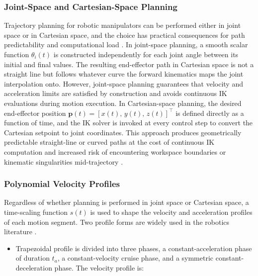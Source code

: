 \subsubsection{Joint-Space and Cartesian-Space Planning}
\hspace{1.27cm}
Trajectory planning for robotic manipulators can be performed
either in joint space or in Cartesian space, and the choice
has practical consequences for path predictability and
computational load \autocite{siciliano-2009}. In
joint-space planning, a smooth scalar function
$\theta_i(t)$ is constructed independently for each joint
angle between its initial and final values. The resulting
end-effector path in Cartesian space is not a straight line
but follows whatever curve the forward kinematics maps the
joint interpolation onto. However, joint-space planning
guarantees that velocity and acceleration limits are satisfied
by construction and avoids continuous IK evaluations during
motion execution. In Cartesian-space planning, the
desired end-effector position
$\mathbf{p}(t) = [x(t),\, y(t),\, z(t)]^{\top}$ is defined
directly as a function of time, and the IK solver is invoked
at every control step to convert the Cartesian setpoint to
joint coordinates. This approach produces geometrically
predictable straight-line or curved paths at the cost of
continuous IK computation and increased risk of encountering
workspace boundaries or kinematic singularities mid-trajectory
\autocite{biagiotti-2008}.

\subsubsection{Polynomial Velocity Profiles}
\hspace{1.27cm}
Regardless of whether planning is performed in joint space or
Cartesian space, a time-scaling function $s(t)$ is used to
shape the velocity and acceleration profiles of each motion
segment. Two profile forms are widely used in the robotics
literature \autocite{biagiotti-2008}.

\par
\hspace{1.27cm}
\begin{itemize}
    \item Trapezoidal profile is divided into three phases, a constant-acceleration phase of duration $t_a$, a
constant-velocity cruise phase, and a symmetric
constant-deceleration phase. The velocity profile is:
\end{itemize}


